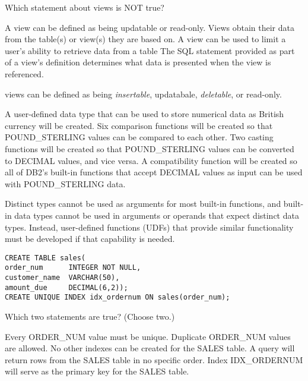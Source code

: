 \documentclass[answers, 11pt]{exam}
\begin{document}
\begin{questions}
\newpage
{}

\question[1]
Which statement about views is NOT true?
\begin{choices}
	\CorrectChoice A view can be defined as being updatable or read-only.
	\choice Views obtain their data from the table(s) or view(s) they are based on.
	\choice A view can be used to limit a user's ability to retrieve data from a table
	\choice The SQL statement provided as part of a view's definition determines what data is 
	presented when the view is referenced.
\end{choices}

\begin{solution}
	views can be defined as being \textit{insertable}, updatabale, \textit{deletable}, or read-only.
\end{solution}

\begin{choices}
	\choice A user-defined data type that can be used to store numerical data as British currency will be
	created.
	\choice Six comparison functions will be created so that POUND\_STERLING values can be compared to each
	other.
	\choice Two casting functions will be created so that POUND\_STERLING values can be converted to DECIMAL
	values, and vice versa.
	\CorrectChoice A compatibility function will be created so all of DB2's built-in functions that accept DECIMAL
	values as input can be used with POUND\_STERLING data.
\end{choices}

\begin{solution}
	Distinct types cannot be used as arguments for most built-in functions, and built-in data types cannot be used in arguments
	or operands that expect distinct data types. Instead, user-defined functions (UDFs) that provide similar functionality must 
	be developed if that capability is needed.
\end{solution}

\begin{verbatim}
CREATE TABLE sales(
order_num      INTEGER NOT NULL,
customer_name  VARCHAR(50),
amount_due     DECIMAL(6,2));
CREATE UNIQUE INDEX idx_ordernum ON sales(order_num);
\end{verbatim}
{\color{red}Which two statements are true? (Choose two.)}
\begin{choices}
	\CorrectChoice Every ORDER\_NUM value must be unique.
	\choice Duplicate ORDER\_NUM values are allowed.
	\choice No other indexes can be created for the SALES table.
	\CorrectChoice A query will return rows from the SALES table in no specific order.
	\choice Index IDX\_ORDERNUM will serve as the primary key for the SALES table.
\end{choices}


\end{questions}
\end{document}
